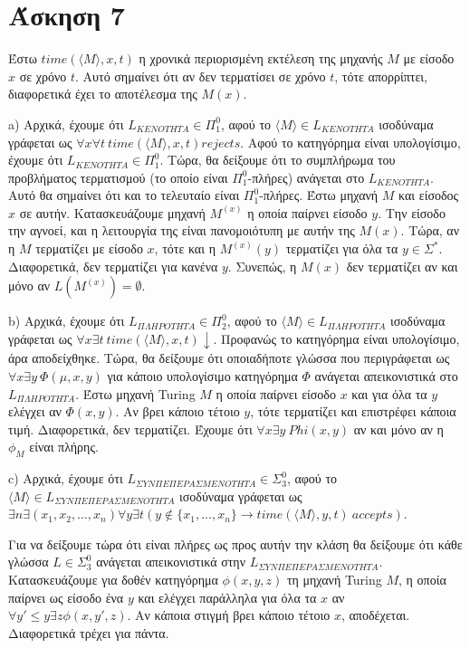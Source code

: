 \documentclass[a4paper, oneside, 11pt]{article}
\theoremstyle{definition}
\begin{document}
\section*{Άσκηση 7}
Έστω $time(\langle M\rangle, x, t)$ η χρονικά περιορισμένη εκτέλεση της μηχανής $M$ με είσοδο $x$ σε χρόνο $t$. Αυτό σημαίνει ότι αν δεν τερματίσει σε χρόνο $t$, τότε απορρίπτει,
διαφορετικά έχει το αποτέλεσμα της $M(x)$.

a) Αρχικά, έχουμε ότι $L_{KENOTHTA}\in \Pi_1^0$, αφού το $\langle M\rangle\in L_{KENOTHTA}$ ισοδύναμα γράφεται ως $\forall x\forall t\ time(\langle M\rangle,x,t) rejects$. 
Αφού το κατηγόρημα είναι υπολογίσιμο, έχουμε ότι $L_{KENOTHTA}\in \Pi_1^0$.
Τώρα, θα δείξουμε ότι το συμπλήρωμα του προβλήματος τερματισμού (το οποίο είναι $\Pi_1^0$-πλήρες) ανάγεται στο $L_{KENOTHTA}$. Αυτό θα σημαίνει ότι και το τελευταίο είναι 
$\Pi_1^0$-πλήρες. Έστω μηχανή $M$ και είσοδος $x$ σε αυτήν. Κατασκευάζουμε μηχανή $M^{(x)}$ η οποία παίρνει είσοδο $y$. Την είσοδο την αγνοεί, και η λειτουργία της είναι
πανομοιότυπη με αυτήν της $M(x)$. Τώρα, αν η $M$ τερματίζει με είσοδο $x$, 
τότε και η $M^{(x)}(y)$ τερματίζει για όλα τα $y\in\Sigma^*$. Διαφορετικά, δεν τερματίζει για κανένα $y$.
Συνεπώς, η $M(x)$ δεν τερματίζει αν και μόνο αν $L(M^{(x)})=\emptyset$.

b) Αρχικά, έχουμε ότι $L_{\Pi\Lambda HPOTHTA}\in \Pi_2^0$, αφού το $\langle M\rangle\in L_{\Pi\Lambda HPOTHTA}$ ισοδύναμα γράφεται ως
$\forall x\exists t\ time(\langle M\rangle, x,t)\downarrow$. Προφανώς το κατηγόρημα είναι υπολογίσιμο, άρα αποδείχθηκε.
Τώρα, θα δείξουμε ότι οποιαδήποτε γλώσσα που περιγράφεται ως $\forall x\exists y\ \Phi (\mu, x,y)$ για κάποιο υπολογίσιμο κατηγόρημα $\Phi$ ανάγεται απεικονιστικά στο
$L_{\Pi\Lambda HPOTHTA}$.
Έστω μηχανή Turing $M$ η οποία παίρνει είσοδο $x$ και για όλα τα $y$ ελέγχει αν $\Phi(x,y)$. Αν βρει κάποιο τέτοιο $y$, τότε τερματίζει και επιστρέφει κάποια τιμή.
Διαφορετικά, δεν τερματίζει. Έχουμε ότι $\forall x\exists y\ Phi(x,y)$ αν και μόνο αν η $\phi_M$ είναι πλήρης.

c) Αρχικά, έχουμε ότι $L_{\Sigma YN\Pi E\Pi EPA\Sigma MENOTHTA}\in \Sigma_3^0$, αφού το $\langle M\rangle \in L_{\Sigma YN\Pi E\Pi EPA\Sigma MENOTHTA}$ ισοδύναμα γράφεται
ως $\exists n \exists (x_1, x_2, ..., x_n)\forall y\exists t (y\notin \{x_1, ..., x_n\} \rightarrow time(\langle M\rangle, y, t)\ accepts)$.

Για να δείξουμε τώρα ότι είναι πλήρες ως προς αυτήν την κλάση θα δείξουμε ότι κάθε γλώσσα $L\in \Sigma_3^0$ ανάγεται απεικονιστικά στην $L_{\Sigma YN\Pi E\Pi EPA\Sigma MENOTHTA}$.
Κατασκευάζουμε για δοθέν κατηγόρημα $\phi(x,y,z)$ τη μηχανή Turing $M$, η οποία παίρνει ως είσοδο ένα $y$ και ελέγχει παράλληλα για όλα τα $x$ αν 
$\forall y'\leq y\exists z\phi(x,y',z)$.
Αν κάποια στιγμή βρει κάποιο τέτοιο $x$, αποδέχεται. Διαφορετικά τρέχει για πάντα.
\end{document}
